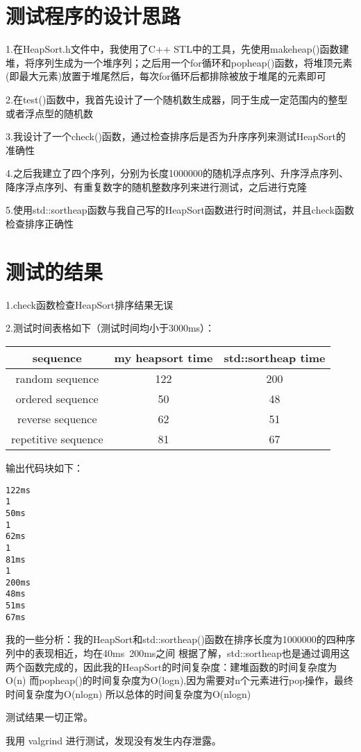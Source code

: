 \documentclass[UTF8]{ctexart}
\begin{document}
	
	\pagestyle{fancy}
	\fancyhead{}
	
	\section{测试程序的设计思路}
	
	1.在HeapSort.h文件中，我使用了C++ STL中的工具，先使用makeheap()函数建堆，将序列生成为一个堆序列；之后用一个for循环和popheap()函数，将堆顶元素(即最大元素)放置于堆尾然后，每次for循环后都排除被放于堆尾的元素即可
	
	2.在test()函数中，我首先设计了一个随机数生成器，同于生成一定范围内的整型或者浮点型的随机数
	
	3.我设计了一个check()函数，通过检查排序后是否为升序序列来测试HeapSort的准确性
	
	4.之后我建立了四个序列，分别为长度1000000的随机浮点序列、升序浮点序列、降序浮点序列、有重复数字的随机整数序列来进行测试，之后进行克隆
	
	5.使用std::sortheap函数与我自己写的HeapSort函数进行时间测试，并且check函数检查排序正确性
	\section{测试的结果}
	
	1.check函数检查HeapSort排序结果无误
	
	2.测试时间表格如下（测试时间均小于3000ms）：
	
	\begin{tabular}{|c|c|c|}
	\hline
	sequence & my heapsort time & std::sortheap time \\ \hline
	random sequence & 122 & 200 \\ \hline
	ordered sequence & 50 & 48 \\ \hline
	reverse sequence & 62 & 51 \\ \hline
	repetitive sequence & 81 & 67 \\ \hline
	
	\end{tabular}

	输出代码块如下：
	\begin{lstlisting}
122ms
1
50ms
1
62ms
1
81ms
1
200ms
48ms
51ms
67ms
	\end{lstlisting}
	
	
		
	我的一些分析：我的HeapSort和std::sortheap()函数在排序长度为1000000的四种序列中的表现相近，均在40ms~200ms之间
	根据了解，std::sortheap也是通过调用这两个函数完成的，因此我的HeapSort的时间复杂度：建堆函数的时间复杂度为O(n)
	而popheap()的时间复杂度为O(logn),因为需要对n个元素进行pop操作，最终时间复杂度为O(nlogn) 
	所以总体的时间复杂度为O(nlogn)
	
	测试结果一切正常。
	
	我用 valgrind 进行测试，发现没有发生内存泄露。
	
	
\end{document}
